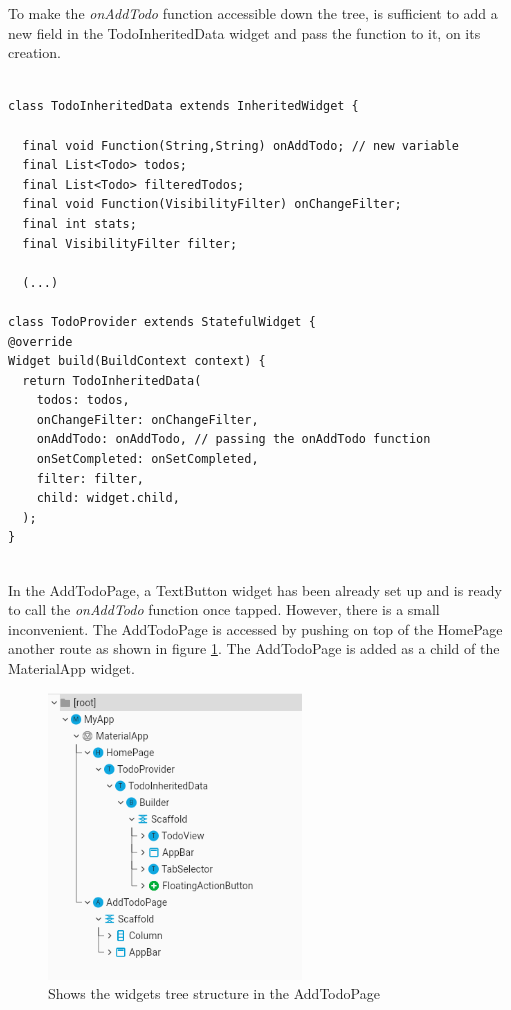 To make the \textit{onAddTodo} function accessible down the tree, is sufficient to add a new field in the TodoInheritedData widget and pass the function to it, on its creation.
\mbox{}\\
\begin{code}

\mbox{}

\label{code:2.33}
\begin{verbatim}

class TodoInheritedData extends InheritedWidget {
  
  final void Function(String,String) onAddTodo; // new variable
  final List<Todo> todos;
  final List<Todo> filteredTodos;
  final void Function(VisibilityFilter) onChangeFilter;
  final int stats;
  final VisibilityFilter filter;

  (...)

class TodoProvider extends StatefulWidget {
@override
Widget build(BuildContext context) {
  return TodoInheritedData(
    todos: todos,
    onChangeFilter: onChangeFilter,
    onAddTodo: onAddTodo, // passing the onAddTodo function
    onSetCompleted: onSetCompleted,
    filter: filter,
    child: widget.child,
  );
}
\end{verbatim}
\end{code}
\mbox{}\\
In the AddTodoPage, a TextButton widget has been already set up and is ready to call the \textit{onAddTodo }function once tapped. However, there is a small inconvenient. The AddTodoPage is accessed by pushing on top of the HomePage another route as shown in figure \ref{fig:add_todo_page_tree_structure}. The AddTodoPage is added as a child of the MaterialApp widget.

\begin{figure}[H]
    \centering
    \includegraphics[width=0.6\textwidth]{Images/tree_structure_on_AddTodoPage.png}
    \caption{Shows the widgets tree structure in the AddTodoPage}
    \label{fig:add_todo_page_tree_structure}
\end{figure}


